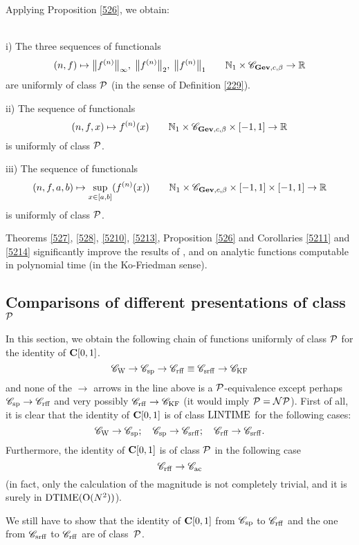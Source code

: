Applying Proposition \ref{526}, we obtain:

\begin{corollary} \label{5214}~\\
i) The three sequences of functionals 
\[
(n,f) \mapsto \big\lVert f^{(n)}  \big\rVert_{\infty} , \;  \big\lVert f^{(n)}  \big\rVert_2, \; \big\lVert f^{(n)}  \big\rVert_1 \qquad  \mathbb {N}_1 \times {{\mathscr C}}_{{\bf Gev},c, \beta} \to \mathbb {R}
\]
are uniformly of class ${\cal P}$ (in the sense of Definition \ref{229}).

\noindent 
ii) The sequence of functionals
\[(n,f,x) \mapsto f^{(n)}(x) \qquad 
\mathbb {N}_1 \times {{\mathscr C}}_{{\bf Gev},c, \beta} \times [-1,1] \to \mathbb {R}  
\] 
is uniformly of class ${\cal P}$.

\noindent 
iii) The sequence of functionals
\[  (n,f,a, b) \mapsto \sup_{x \in [a,b]} (f^{(n)}(x)) \qquad 
\mathbb {N}_1 \times {{\mathscr C}}_{{\bf Gev},c, \beta} \times [-1,1] \times [-1,1] \to \mathbb {R} 
\] 
is uniformly of class ${\cal P}$. 
\end{corollary}

\begin{remark} 
Theorems \ref{527}, \ref{528}, \ref{5210}, \ref{5213}, Proposition \ref{526} and Corollaries \ref{5211} and \ref{5214} significantly improve the results of \cite{KF82}, \cite{KF88} and \cite{Mu87} on analytic functions computable in polynomial time (in the Ko-Friedman sense).
\end{remark}


\subsection {Comparisons of different presentations of class ${\cal P}$}\label{subsec53}

In this section, we obtain the following chain of functions uniformly of class ${\cal P}$ for the identity of ${{\bf C}[0,1]}$. 
\[
{{{\mathscr C}}_{\rm W}} \to {{{\mathscr C}}_{\rm sp}} \to {{{\mathscr C}}_{\rm rff}} \equiv {{{\mathscr C}}_{\rm srff}} \to {{{\mathscr C}}_{\rm KF}} 
\] 
and none of the $\to$ arrows in the line above is a ${\cal P}$-equivalence except perhaps ${{{\mathscr C}}_{\rm sp}} \to {{{\mathscr C}}_{\rm rff}}$ and very possibly ${{{\mathscr C}}_{\rm rff}} \to {{{\mathscr C}}_{\rm KF}}$ (it would imply ${\cal P} = {\cal NP}$).
First of all, it is clear that the identity of ${{\bf C}[0,1]}$ is of class ${\rm LINTIME}$ for the following cases: 
\[
{{{\mathscr C}}_{\rm W}} \to {{{\mathscr C}}_{\rm sp}} ; \quad  {{{\mathscr C}}_{\rm sp}} \to {{{\mathscr C}}_{\rm srff}}; \quad  {{{\mathscr C}}_{\rm rff}} \to {{{\mathscr C}}_{\rm srff}} .
\]
Furthermore, the identity of ${{\bf C}[0,1]}$ is of class ${\cal P}$ in the following case 
\[
{{{\mathscr C}}_{\rm rff}} \to {{{\mathscr C}}_{\rm ac}} 
\] 
(in fact, only the calculation of the magnitude is not completely trivial, and it is surely in ${\rm DTIME} ({\rm O}(N^2))$). 

We still have to show that the identity of ${{\bf C}[0,1]}$ from ${{{\mathscr C}}_{\rm sp}}$ to ${{{\mathscr C}}_{\rm rff}}$ and the one from ${{{\mathscr C}}_{\rm srff}}$ to ${{{\mathscr C}}_{\rm rff}}$ are of class~${\cal P}$.

